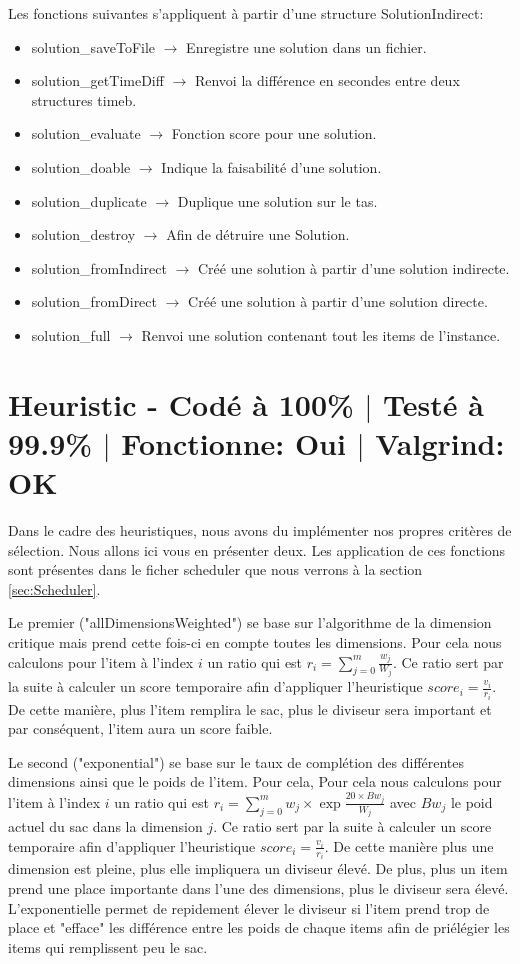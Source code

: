 \documentclass{EPUProjetPeiP}
\newcommand{\comp}[5]{
	\section[#1]{#1 {\small - Codé à #2\% $\vert$ Testé à #3\% $\vert$ Fonctionne: #4 $\vert$ Valgrind: #5}}
}
\begin{document}
Les fonctions suivantes s'appliquent à partir d'une structure SolutionIndirect:
\begin{itemize}
	\item solution\_saveToFile $\longrightarrow$ Enregistre une solution dans un fichier.
	\item solution\_getTimeDiff $\longrightarrow$ Renvoi la différence en secondes entre deux structures timeb.
	\item solution\_evaluate $\longrightarrow$ Fonction score pour une solution.
	\item solution\_doable $\longrightarrow$ Indique la faisabilité d'une solution.
	\item solution\_duplicate $\longrightarrow$ Duplique une solution sur le tas.
	\item solution\_destroy $\longrightarrow$ Afin de détruire une Solution.
	\item solution\_fromIndirect $\longrightarrow$ Créé une solution à partir d'une solution indirecte.
	\item solution\_fromDirect $\longrightarrow$ Créé une solution à partir d'une solution directe.
	\item solution\_full $\longrightarrow$ Renvoi une solution contenant tout les items de l'instance.
\end{itemize}

\comp{Heuristic \label{sec:Heuristic}}{100}{99.9}{Oui}{OK}
Dans le cadre des heuristiques, nous avons du implémenter nos propres critères de sélection. Nous allons ici vous en présenter deux. Les application de ces fonctions sont présentes dans le ficher scheduler que nous verrons à la section \ref{sec:Scheduler}.

Le premier ("allDimensionsWeighted") se base sur l'algorithme de la dimension critique mais prend cette fois-ci en compte toutes les dimensions. Pour cela nous calculons pour l'item à l'index $i$ un ratio qui est $r_i=\sum_{j=0}^m\frac{w_j}{W_j}$. Ce ratio sert par la suite à calculer un score temporaire afin d'appliquer l'heuristique $score_i=\frac{v_i}{r_i}$. De cette manière, plus l'item remplira le sac, plus le diviseur sera important et par conséquent, l'item aura un score faible.

Le second ("exponential") se base sur le taux de complétion des différentes dimensions ainsi que le poids de l'item. Pour cela, Pour cela nous calculons pour l'item à l'index $i$ un ratio qui est $r_i=\sum_{j=0}^mw_j\times\exp{\frac{20\times Bw_j}{W_j}}$ avec $Bw_j$ le poid actuel du sac dans la dimension $j$. Ce ratio sert par la suite à calculer un score temporaire afin d'appliquer l'heuristique $score_i=\frac{v_i}{r_i}$. De cette manière plus une dimension est pleine, plus elle impliquera un diviseur élevé. De plus, plus un item prend une place importante dans l'une des dimensions, plus le diviseur sera élevé. L'exponentielle permet de repidement élever le diviseur si l'item prend trop de place et "efface" les différence entre les poids de chaque items afin de priélégier les items qui remplissent peu le sac.
\end{document}
